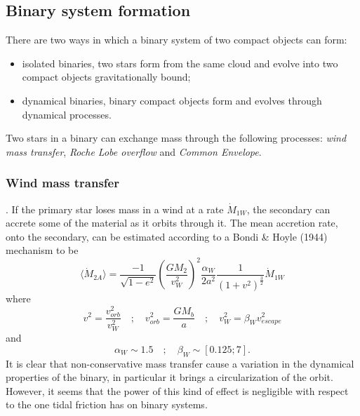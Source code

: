 \documentclass[prb,twocolumn,9pt]{revtex4-1}
\begin{document}
\subsection{Binary system formation}
There are two ways in which a binary system of two compact objects can form: 
\begin{itemize}
    \item isolated binaries, two stars form from the same cloud and evolve into two compact objects gravitationally bound;
    \item dynamical binaries, binary compact objects form and evolves through dynamical processes.
\end{itemize}

Two stars in a binary can exchange mass through the following processes: \textit{wind mass transfer}, \textit{Roche Lobe overflow} and \textit{Common Envelope}.

\subsubsection{Wind mass transfer}.
If the primary star loses mass in a wind at a rate \(\dot M_{1W}\), the secondary can accrete some of the material as it orbits through it.
The mean accretion rate, onto the secondary, can be estimated according to a Bondi \& Hoyle (1944) mechanism to be
\begin{equation}
    \langle \dot M_{2A} \rangle = \frac{-1}{\sqrt{1-e^2}}\left (\frac{GM_2}{v_W^2}\right )^2\frac{\alpha_W}{2a^2}\frac{1}{(1+v^2)^{\frac{3}{2}}}\dot M_{1W}
\end{equation}
where
\begin{equation}
    v^2 = \frac{v_{orb}^2}{v_W^2} \quad ; \quad v_{orb}^2 = \frac{GM_b}{a} \quad ; \quad     v_W^2 = \beta_Wv_{escape}^2
    \nonumber
\end{equation}
and 
\begin{equation}
    \alpha_W \sim 1.5 \quad ; \quad \beta_W \sim [0.125;7].
    \nonumber
\end{equation}
It is clear that non-conservative mass transfer cause a variation in the dynamical properties of the binary, in particular it brings a circularization of the orbit. However, it seems that the power of this kind of effect is negligible with respect to the one tidal friction has on binary systems. 
\end{document}

